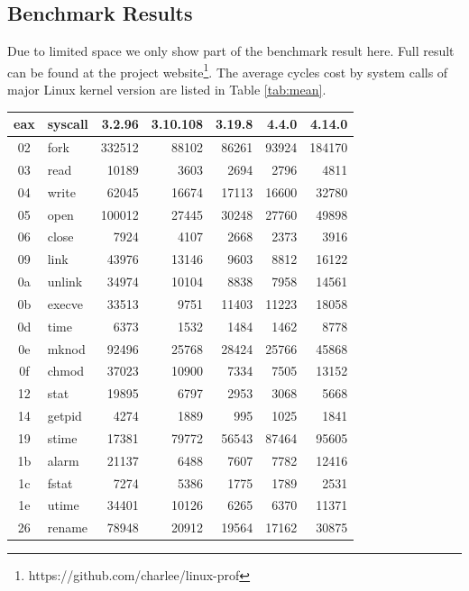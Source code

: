 \documentclass{article}
\begin{document}
\subsection{Benchmark Results}

Due to limited space we only show part of the benchmark result here. Full result can be found at the project website\footnote{https://github.com/charlee/linux-prof}.
The average cycles cost by system calls of major Linux kernel version are listed in Table \ref{tab:mean}.


\begin{table}
    \centering
    \begin{tabular}{clrrrrr}
        \toprule
        eax & syscall & 3.2.96 & 3.10.108 & 3.19.8 & 4.4.0 & 4.14.0 \\
        \midrule
        02 & fork & 332512 & 88102 & 86261 & 93924 & 184170 \\
        03 & read & 10189 & 3603 & 2694 & 2796 & 4811 \\
        04 & write & 62045 & 16674 & 17113 & 16600 & 32780 \\
        05 & open & 100012 & 27445 & 30248 & 27760 & 49898 \\
        06 & close & 7924 & 4107 & 2668 & 2373 & 3916 \\
        09 & link & 43976 & 13146 & 9603 & 8812 & 16122 \\
        0a & unlink & 34974 & 10104 & 8838 & 7958 & 14561 \\
        0b & execve & 33513 & 9751 & 11403 & 11223 & 18058 \\
        0d & time & 6373 & 1532 & 1484 & 1462 & 8778 \\
        0e & mknod & 92496 & 25768 & 28424 & 25766 & 45868 \\
        0f & chmod & 37023 & 10900 & 7334 & 7505 & 13152 \\
        12 & stat & 19895 & 6797 & 2953 & 3068 & 5668 \\
        14 & getpid & 4274 & 1889 & 995 & 1025 & 1841 \\
        19 & stime & 17381 & 79772 & 56543 & 87464 & 95605 \\
        1b & alarm & 21137 & 6488 & 7607 & 7782 & 12416 \\
        1c & fstat & 7274 & 5386 & 1775 & 1789 & 2531 \\
        1e & utime & 34401 & 10126 & 6265 & 6370 & 11371 \\
        26 & rename & 78948 & 20912 & 19564 & 17162 & 30875 \\

\end{tabular}
\end{table}
\end{document}
